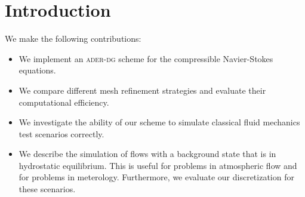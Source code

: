 \chapter{Introduction}
We make the following contributions:

\begin{itemize}
\item We implement an \textsc{ader-dg} scheme for the compressible Navier-Stokes equations.
\item We compare different mesh refinement strategies and evaluate their computational efficiency.
\item We investigate the ability of our scheme to simulate classical fluid mechanics test scenarios correctly.
\item We describe the simulation of flows with a background state that is in hydrostatic equilibrium.
  This is useful for problems in atmospheric flow and for problems in meterology.
  Furthermore, we evaluate our discretization for these scenarios.
\end{itemize}

